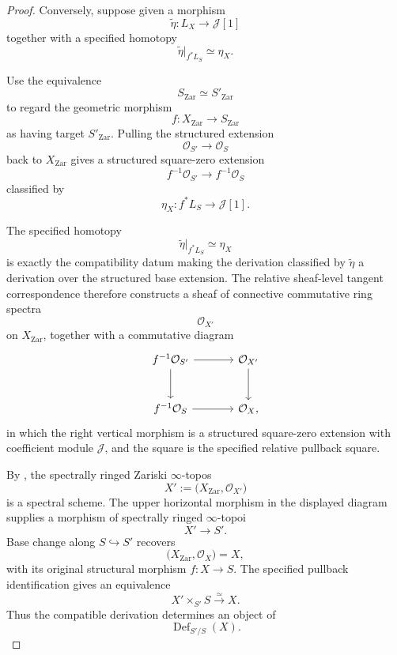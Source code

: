 \begin{proof}
Conversely, suppose given a morphism
\[
    \widetilde\eta
    \colon
    L_X
    \longrightarrow
    \mathcal J[1]
\]
together with a specified homotopy
\[
    \widetilde\eta|_{f^*L_S}
    \simeq
    \eta_X.
\]

Use the equivalence
\[
    S_{\mathrm{Zar}}
    \simeq
    S'_{\mathrm{Zar}}
\]
to regard the geometric morphism
\[
    f
    \colon
    X_{\mathrm{Zar}}
    \longrightarrow
    S_{\mathrm{Zar}}
\]
as having target \(S'_{\mathrm{Zar}}\). Pulling the structured
extension
\[
    \mathcal O_{S'}
    \longrightarrow
    \mathcal O_S
\]
back to \(X_{\mathrm{Zar}}\) gives a structured square-zero extension
\[
    f^{-1}\mathcal O_{S'}
    \longrightarrow
    f^{-1}\mathcal O_S
\]
classified by
\[
    \eta_X
    \colon
    f^*L_S
    \longrightarrow
    \mathcal J[1].
\]

The specified homotopy
\[
    \widetilde\eta|_{f^*L_S}
    \simeq
    \eta_X
\]
is exactly the compatibility datum making the derivation classified by
\(\widetilde\eta\) a derivation over the structured base extension.
The relative sheaf-level tangent correspondence therefore constructs a
sheaf of connective commutative ring spectra
\[
    \mathcal O_{X'}
\]
on \(X_{\mathrm{Zar}}\), together with a commutative diagram
\[
\begin{tikzcd}[column sep=large, row sep=large]
    f^{-1}\mathcal O_{S'}
        \arrow[r]
        \arrow[d]
    &
    \mathcal O_{X'}
        \arrow[d]
    \\
    f^{-1}\mathcal O_S
        \arrow[r]
    &
    \mathcal O_X,
\end{tikzcd}
\]
in which the right vertical morphism is a structured square-zero
extension with coefficient module \(\mathcal J\), and the square is the
specified relative pullback square.

By
, the spectrally ringed
Zariski \(\infty\)-topos
\[
    X'
    :=
    \bigl(
        X_{\mathrm{Zar}},
        \mathcal O_{X'}
    \bigr)
\]
is a spectral scheme. The upper horizontal morphism in the displayed
diagram supplies a morphism of spectrally ringed \(\infty\)-topoi
\[
    X'
    \longrightarrow
    S'.
\]
Base change along \(S\hookrightarrow S'\) recovers
\[
    \bigl(
        X_{\mathrm{Zar}},
        \mathcal O_X
    \bigr)
    =
    X,
\]
with its original structural morphism \(f:X\to S\). The specified
pullback identification gives an equivalence
\[
    X'\times_{S'}S
    \xrightarrow{\simeq}
    X.
\]
Thus the compatible derivation determines an object of
\[
    \operatorname{Def}_{S'/S}(X).
\]


\end{proof}
